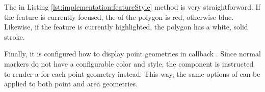 

The  in Listing \ref{lst:implementation:featureStyle} method is very straightforward.
If the feature is currently focused, the  of the polygon is red, otherwise blue.
Likewise, if the feature is currently highlighted, the polygon has a white, solid stroke.



Finally, it is configured how to display point geometries in callback .
Since normal markers do not have a configurable color and style, the  component is instructed to render a  for each point geometry instead.
This way, the same options of  can be applied to both point and area geometries.




